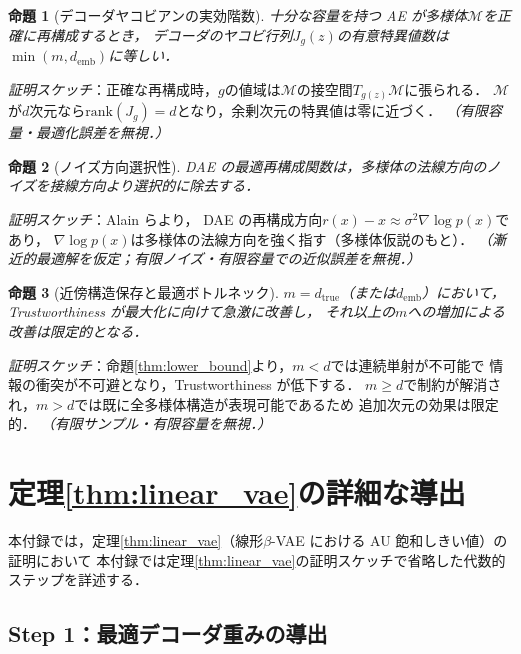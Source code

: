 \documentclass[11pt,a4paper]{jsarticle}
\newtheorem{proposition}{命題}
\newcommand{\dtrue}{d_{\mathrm{true}}}
\newcommand{\Jg}{J_g}
\newcommand{\demb}{d_{\mathrm{emb}}}
\begin{document}
\begin{proposition}[デコーダヤコビアンの実効階数]\label{thm:rank}
十分な容量を持つ AE が多様体$\mathcal{M}$を正確に再構成するとき，
デコーダのヤコビ行列$\Jg(z)$の有意特異値数は$\min(m, \demb)$に等しい．
\end{proposition}
\textit{証明スケッチ}：正確な再構成時，$g$の値域は$\mathcal{M}$の接空間$T_{g(z)}\mathcal{M}$に張られる．
$\mathcal{M}$が$d$次元なら$\mathrm{rank}(\Jg) = d$となり，余剰次元の特異値は零に近づく．
\textit{（有限容量・最適化誤差を無視．）}

\begin{proposition}[ノイズ方向選択性]\label{thm:nsr}
DAE の最適再構成関数は，多様体の法線方向のノイズを接線方向より選択的に除去する．
\end{proposition}
\textit{証明スケッチ}：Alain ら\cite{alain2014dae}より，
DAE の再構成方向$r(x) - x \approx \sigma^2 \nabla\log p(x)$であり，
$\nabla\log p(x)$は多様体の法線方向を強く指す（多様体仮説のもと）．
\textit{（漸近的最適解を仮定；有限ノイズ・有限容量での近似誤差を無視．）}

\begin{proposition}[近傍構造保存と最適ボトルネック]\label{thm:trust}
$m = \dtrue$（または$\demb$）において，Trustworthiness が最大化に向けて急激に改善し，
それ以上の$m$への増加による改善は限定的となる．
\end{proposition}
\textit{証明スケッチ}：命題\ref{thm:lower_bound}より，$m < d$では連続単射が不可能で
情報の衝突が不可避となり，Trustworthiness が低下する．
$m \geq d$で制約が解消され，$m > d$では既に全多様体構造が表現可能であるため
追加次元の効果は限定的．
\textit{（有限サンプル・有限容量を無視．）}

\section{定理\ref{thm:linear_vae}の詳細な導出}\label{app:linear_vae_proof}

本付録では，定理\ref{thm:linear_vae}（線形$\beta$-VAE における AU 飽和しきい値）の証明において
本付録では定理\ref{thm:linear_vae}の証明スケッチで省略した代数的ステップを詳述する．

\subsection*{Step 1：最適デコーダ重みの導出}
\end{document}

